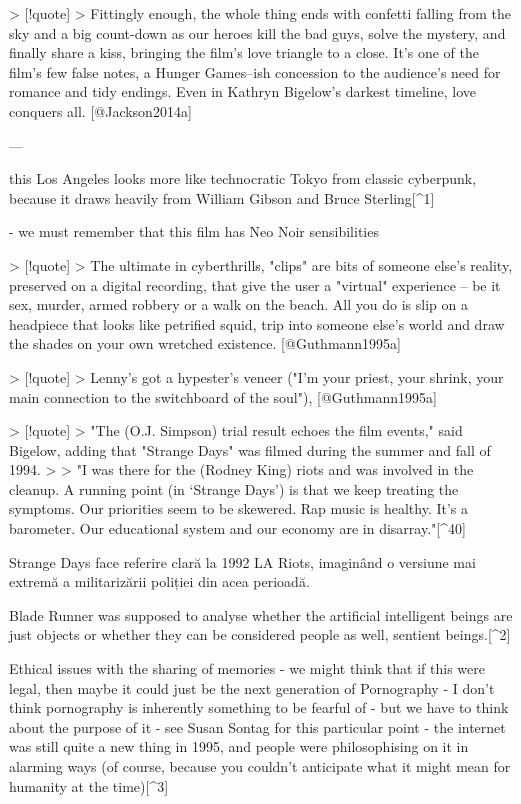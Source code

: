 \documentclass[a4paper, 12pt]{article}
\begin{document}
> [!quote]
> Fittingly enough, the whole thing ends with confetti falling from the sky and a big count-down as our heroes kill the bad guys, solve the mystery, and finally share a kiss, bringing the film's love triangle to a close. It's one of the film's few false notes, a Hunger Games–ish concession to the audience's need for romance and tidy endings. Even in Kathryn Bigelow's darkest timeline, love conquers all. [@Jackson2014a]

---

this Los Angeles looks more like technocratic Tokyo from classic cyberpunk, because it draws heavily from William Gibson and Bruce Sterling[^1]

- we must remember that this film has Neo Noir sensibilities

> [!quote]
> The ultimate in cyberthrills, "clips" are bits of someone else's reality, preserved on a digital recording, that give the user a "virtual" experience -- be it sex, murder, armed robbery or a walk on the beach. All you do is slip on a headpiece that looks like petrified squid, trip into someone else's world and draw the shades on your own wretched existence. [@Guthmann1995a]

> [!quote]
> Lenny's got a hypester's veneer ("I'm your priest, your shrink, your main connection to the switchboard of the soul"), [@Guthmann1995a]

> [!quote]
> "The (O.J. Simpson) trial result echoes the film events," said Bigelow, adding that "Strange Days" was filmed during the summer and fall of 1994.
>
> "I was there for the (Rodney King) riots and was involved in the cleanup. A running point (in `Strange Days') is that we keep treating the symptoms. Our priorities seem to be skewered. Rap music is healthy. It's a barometer. Our educational system and our economy are in disarray."[^40]

Strange Days face referire clară la 1992 LA Riots, imaginând o versiune mai extremă a militarizării poliției din acea perioadă. 

Blade Runner was supposed to analyse whether the artificial intelligent beings are just objects or whether they can be considered people as well, sentient beings.[^2]

Ethical issues with the sharing of memories
- we might think that if this were legal, then maybe it could just be the next generation of Pornography
- I don't think pornography is inherently something to be fearful of
- but we have to think about the purpose of it
- see Susan Sontag for this particular point
- the internet was still quite a new thing in 1995, and people were philosophising on it in alarming ways (of course, because you couldn't anticipate what it might mean for humanity at the time)[^3]
\end{document}
